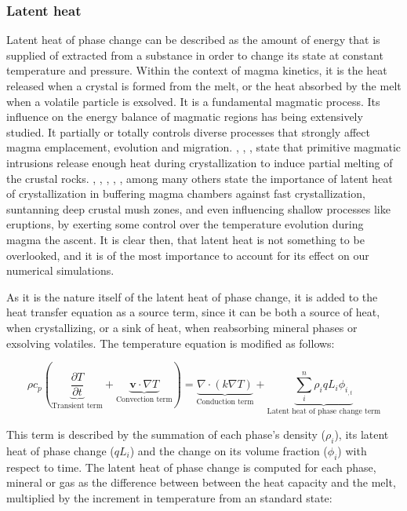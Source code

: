 \subsubsection{Latent heat}
Latent heat of phase change can be described as the amount of energy that is supplied of extracted from a substance in order to change its state at constant temperature and pressure. Within the context of magma kinetics, it is the heat released when a crystal is formed from the melt, or the heat absorbed by the melt when a volatile particle is exsolved. It is a fundamental magmatic process. Its influence on the energy balance of magmatic regions has being extensively studied. It partially or totally controls diverse processes that strongly affect magma emplacement, evolution and migration. \cite{depaolo1981}, \cite{huppert1988}, \cite{spera2001}, \cite{tavazzani2024} state that primitive magmatic intrusions release enough heat during crystallization to induce partial melting of the crustal rocks. \cite{anne2005}, \cite{blundy2006}, \cite{dufek2010}, \cite{namur2014}, \cite{newcombe2020}, among many others state the importance of latent heat of crystallization in buffering magma chambers against fast crystallization, suntanning deep crustal mush zones, and even influencing shallow processes like eruptions, by exerting some control over the temperature evolution during magma the ascent. It is clear then, that latent heat is not something to be overlooked, and it is of the most importance to account for its effect on our numerical simulations. 

As it is the nature itself of the latent heat of phase change, it is added to the heat transfer equation as a source term, since it can be both a source of heat, when crystallizing, or a sink of heat, when reabsorbing mineral phases or exsolving volatiles. The temperature equation is modified as follows:

\begin{equation}
	\rho c_p \left(\underbrace{\frac{\partial T}{\partial t}}_{\text{Transient term}} + \underbrace{\mathbf{v} \cdot \nabla T }_{\text{Convection term}}\right) = \underbrace{\nabla \cdot (k \nabla T)}_{\text{Conduction term}} + \underbrace{\sum_{i}^n\rho_iqL_i\phi_{i_{,t}}}_{\text{Latent heat of phase change term}}
\end{equation}

This term is described by the summation of each phase's density ($\rho_i$), its latent heat of phase change ($qL_i$) and the change on its volume fraction ($\phi_i$) with respect to time. The latent heat of phase change is computed for each phase, mineral or gas as the difference between between the heat capacity and the melt, multiplied by the increment in temperature from an standard state:

